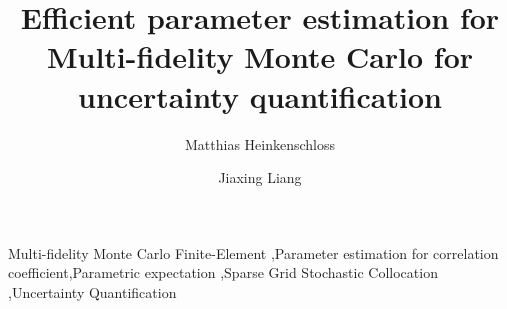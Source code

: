 \documentclass[final,3p,times,11pt]{elsarticle}
\begin{document}
\begin{frontmatter}
\title{Efficient parameter estimation for Multi-fidelity Monte Carlo for uncertainty quantification}


\author[umdcs]{Matthias Heinkenschloss}
\address[umdcs]{Department of Computational Applied Mathematics \& Operations Research, Rice University.}
\author[umdm]{Jiaxing Liang}
\address[umdm]{Department of Computational Applied Mathematics \& Operations Research, Rice University.}
\begin{abstract}
\end{abstract}

\begin{keyword}
Multi-fidelity Monte Carlo Finite-Element \sep Parameter estimation for correlation coefficient\sep Parametric expectation \sep Sparse Grid Stochastic Collocation \sep Uncertainty Quantification
%
\MSC[2020] 
\end{keyword}
\end{frontmatter}

 
%  
% 


% 





% 

\end{document}
